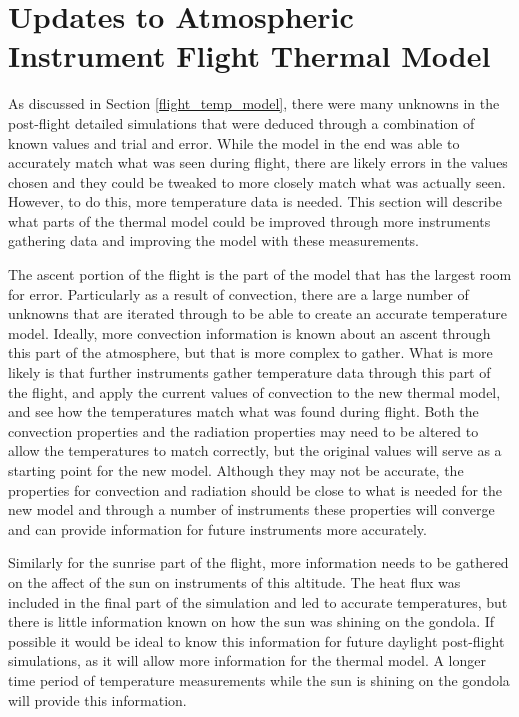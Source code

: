 \section{Updates to Atmospheric Instrument Flight Thermal Model}
As discussed in Section \ref{flight_temp_model}, there were many unknowns in the post-flight detailed simulations that were deduced through a combination of known values and trial and error. While the model in the end was able to accurately match what was seen during flight, there are likely errors in the values chosen and they could be tweaked to more closely match what was actually seen. However, to do this, more temperature data is needed. This section will describe what parts of the thermal model could be improved through more instruments gathering data and improving the model with these measurements.

The ascent portion of the flight is the part of the model that has the largest room for error. Particularly as a result of convection, there are a large number of unknowns that are iterated through to be able to create an accurate temperature model. Ideally, more convection information is known about an ascent through this part of the atmosphere, but that is more complex to gather. What is more likely is that further instruments gather temperature data through this part of the flight, and apply the current values of convection to the new thermal model, and see how the temperatures match what was found during flight. Both the convection properties and the radiation properties may need to be altered to allow the temperatures to match correctly, but the original values will serve as a starting point for the new model. Although they may not be accurate, the properties for convection and radiation should be close to what is needed for the new model and through a number of instruments these properties will converge and can provide information for future instruments more accurately. 

Similarly for the sunrise part of the flight, more information needs to be gathered on the affect of the sun on instruments of this altitude. The heat flux was included in the final part of the simulation and led to accurate temperatures, but there is little information known on how the sun was shining on the gondola. If possible it would be ideal to know this information for future daylight post-flight simulations, as it will allow more information for the thermal model. A longer time period of temperature measurements while the sun is shining on the gondola will provide this information.

